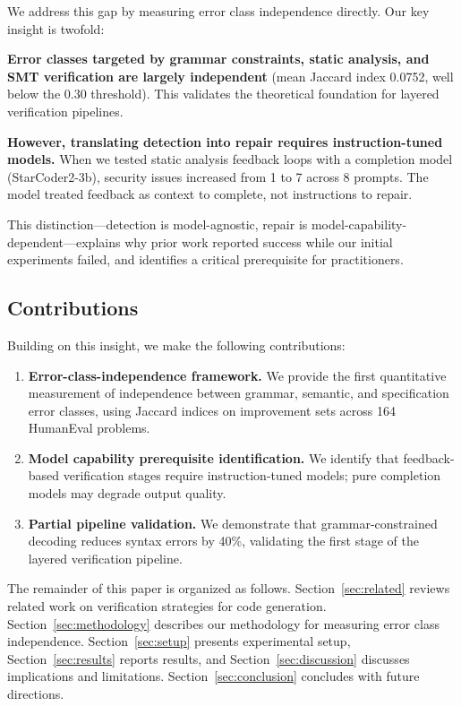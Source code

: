 We address this gap by measuring error class independence directly. Our key insight is twofold:

\textbf{Error classes targeted by grammar constraints, static analysis, and SMT verification are largely independent} (mean Jaccard index 0.0752, well below the 0.30 threshold). This validates the theoretical foundation for layered verification pipelines.

\textbf{However, translating detection into repair requires instruction-tuned models.} When we tested static analysis feedback loops with a completion model (StarCoder2-3b), security issues increased from 1 to 7 across 8 prompts. The model treated feedback as context to complete, not instructions to repair.

This distinction---detection is model-agnostic, repair is model-capability-dependent---explains why prior work reported success while our initial experiments failed, and identifies a critical prerequisite for practitioners.

\subsection{Contributions}

Building on this insight, we make the following contributions:

\begin{enumerate}
    \item \textbf{Error-class-independence framework.} We provide the first quantitative measurement of independence between grammar, semantic, and specification error classes, using Jaccard indices on improvement sets across 164 HumanEval problems.

    \item \textbf{Model capability prerequisite identification.} We identify that feedback-based verification stages require instruction-tuned models; pure completion models may degrade output quality.

    \item \textbf{Partial pipeline validation.} We demonstrate that grammar-constrained decoding reduces syntax errors by 40\%, validating the first stage of the layered verification pipeline.
\end{enumerate}

The remainder of this paper is organized as follows. Section~\ref{sec:related} reviews related work on verification strategies for code generation. Section~\ref{sec:methodology} describes our methodology for measuring error class independence. Section~\ref{sec:setup} presents experimental setup, Section~\ref{sec:results} reports results, and Section~\ref{sec:discussion} discusses implications and limitations. Section~\ref{sec:conclusion} concludes with future directions.
